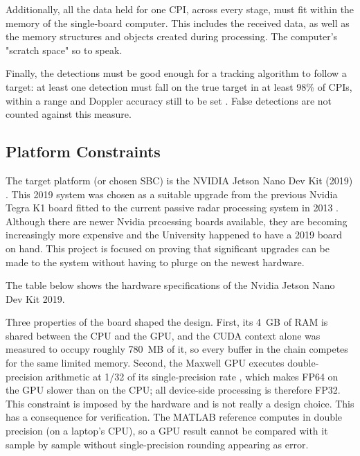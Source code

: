 Additionally, all the data held for one CPI, across every stage, must fit within the memory of the single-board computer. This includes the received data, as well as the memory structures and objects created during processing. The computer's "scratch space" so to speak.

Finally, the detections must be good enough for a tracking algorithm to follow a target: at least one detection must fall on the true target in at least 98\%  of CPIs, within a range and Doppler accuracy still to be set . False detections are not counted against this measure.

\subsection{Platform Constraints}
\label{subsec:ch3.requirements.platform}

The target platform (or chosen SBC) is the NVIDIA Jetson Nano Dev Kit (2019) . 
This 2019 system was chosen as a suitable upgrade from the previous Nvidia Tegra K1 board fitted to the current passive radar processing system in 2013 . Although there are newer Nvidia prcoessing boards available, they are becoming increasingly more expensive and the University happened to have a 2019 board on hand. This project is focused on proving that significant upgrades can be made to the system without having to plurge on the newest hardware.

The table below  shows the hardware specifications of the Nvidia Jetson Nano Dev Kit 2019.


Three properties of the board shaped the design. First, its 4~GB of RAM is shared between the CPU and the GPU, and the CUDA context alone was measured to occupy roughly 780~MB of it, so every buffer in the chain competes for the same limited memory. Second, the Maxwell GPU executes double-precision arithmetic at 1/32 of its single-precision rate \citep{nvidia2020cuda}, which makes FP64 on the GPU slower than on the CPU; all device-side processing is therefore FP32. This constraint is imposed by the hardware and is not really a design choice. This has a consequence for verification. The MATLAB reference computes in double precision (on a laptop's CPU), so a GPU result cannot be compared with it sample by sample without single-precision rounding appearing as error. 

